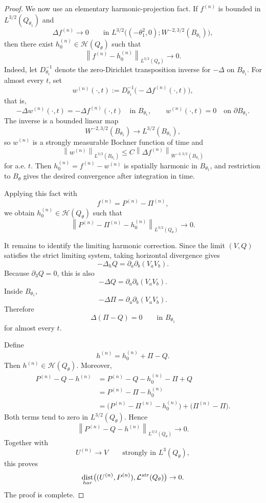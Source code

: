\documentclass[10pt,a4paper]{amsart}
\newcommand{\calH}{\mathcal H}
\newcommand{\calL}{\mathcal L}
\DeclareMathOperator{\dist}{dist}
\newcommand{\norm}[2]{\left\|#1\right\|_{#2}}
\begin{document}
\begin{proof}
We now use an elementary harmonic-projection fact.  If \(f^{(n)}\) is bounded in \(L^{3/2}(Q_{\theta_1})\) and
\[
        \Delta f^{(n)}\to0
        \qquad\text{in }
        L^{3/2}\bigl((-\theta_1^2,0);W^{-2,3/2}(B_{\theta_1})\bigr),
\]
then there exist \(h_0^{(n)}\in\calH(Q_\theta)\) such that
\[
        \norm{f^{(n)}-h_0^{(n)}}{L^{3/2}(Q_\theta)}\to0 .
\]
Indeed, let \(D^{-1}_{\theta_1}\) denote the zero-Dirichlet transposition inverse for \(-\Delta\) on \(B_{\theta_1}\).  For almost every \(t\), set
\[
        w^{(n)}(\cdot,t)
        :=D^{-1}_{\theta_1}\bigl(-\Delta f^{(n)}(\cdot,t)\bigr),
\]
that is,
\[
        -\Delta w^{(n)}(\cdot,t)
        =
        -\Delta f^{(n)}(\cdot,t)
        \quad\text{in }B_{\theta_1},
        \qquad
        w^{(n)}(\cdot,t)=0
        \quad\text{on }\partial B_{\theta_1}.
\]
The inverse is a bounded linear map
\[
        W^{-2,3/2}(B_{\theta_1})\longrightarrow L^{3/2}(B_{\theta_1}),
\]
so \(w^{(n)}\) is a strongly measurable Bochner function of time and
\[
        \norm{w^{(n)}}{L^{3/2}(B_{\theta_1})}
        \le
        C\norm{\Delta f^{(n)}}{W^{-2,3/2}(B_{\theta_1})}
\]
for a.e. \(t\).  Then \(h_0^{(n)}=f^{(n)}-w^{(n)}\) is spatially harmonic in \(B_{\theta_1}\), and restriction to \(B_\theta\) gives the desired convergence after integration in time.

Applying this fact with
\[
        f^{(n)}=P^{(n)}-\Pi^{(n)},
\]
we obtain \(h_0^{(n)}\in\calH(Q_\theta)\) such that
\[
        \norm{P^{(n)}-\Pi^{(n)}-h_0^{(n)}}{L^{3/2}(Q_\theta)}\to0 .
\]

It remains to identify the limiting harmonic correction.  Since the limit \((V,Q)\) satisfies the strict limiting system, taking horizontal divergence gives
\[
        -\Delta_hQ
        =
        \partial_a\partial_b(V_aV_b).
\]
Because \(\partial_3Q=0\), this is also
\[
        -\Delta Q
        =
        \partial_a\partial_b(V_aV_b).
\]
Inside \(B_{\theta_1}\),
\[
        -\Delta\Pi
        =
        \partial_a\partial_b(V_aV_b).
\]
Therefore
\[
        \Delta(\Pi-Q)=0
        \qquad\text{in }B_{\theta_1}
\]
for almost every \(t\).

Define
\[
        h^{(n)}=h_0^{(n)}+\Pi-Q .
\]
Then \(h^{(n)}\in\calH(Q_\theta)\).  Moreover,
\begin{align*}
P^{(n)}-Q-h^{(n)}
&=P^{(n)}-Q-h_0^{(n)}-\Pi+Q
\\
&=P^{(n)}-\Pi-h_0^{(n)}
\\
&=\bigl(P^{(n)}-\Pi^{(n)}-h_0^{(n)}\bigr)
+\bigl(\Pi^{(n)}-\Pi\bigr).
\end{align*}
Both terms tend to zero in \(L^{3/2}(Q_\theta)\).  Hence
\[
        \norm{P^{(n)}-Q-h^{(n)}}{L^{3/2}(Q_\theta)}\to0 .
\]
Together with
\[
        U^{(n)}\to V
        \qquad\text{strongly in }L^3(Q_\theta),
\]
this proves
\[
        \dist_{\rm har}
        \bigl((U^{(n)},P^{(n)}),\calL^{\rm str}(Q_\theta)\bigr)
        \to0 .
\]
The proof is complete.
\end{proof}
\end{document}

